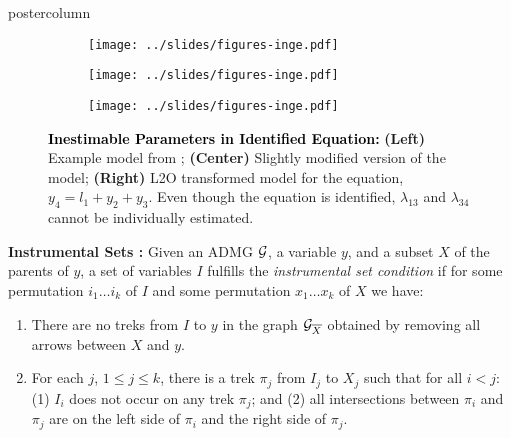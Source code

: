 \documentclass{beamer}
\newlength{\columnheight}
\begin{document}
\begin{frame}
\begin{columns}
	\begin{column}{0.33\textwidth}
		\begin{beamercolorbox}[center]{postercolumn}
			\begin{minipage}{.98\textwidth} %
				\parbox[t][\columnheight]{\textwidth}{ %
				\begin{myblock}{}
					\begin{figure}
						\begin{subfigure}{0.33 \linewidth}
							\centering
							\texttt{[image: ../slides/figures-inge.pdf]}
						\end{subfigure}%
						\begin{subfigure}{0.33 \linewidth}
							\centering
							\texttt{[image: ../slides/figures-inge.pdf]}
						\end{subfigure}%
						\begin{subfigure}{0.33 \linewidth}
							\centering
							\texttt{[image: ../slides/figures-inge.pdf]}
						\end{subfigure}
						\caption*{\textbf{\textcolor{black}{Inestimable Parameters in Identified Equation:}} \textbf{(Left)} Example model 
						from \citet{griliches1977estimating}; \textbf{(Center)} Slightly modified version of the model; \textbf{(Right)} L2O transformed
						model for the equation, $ y_4 = l_1 + y_2 + y_3 $. Even though the equation is identified, $ \lambda_{13} $ and 
						$ \lambda_{34} $ cannot be individually estimated.}
					\end{figure}
				\end{myblock}
	\begin{myblock}{}
		\textbf{Instrumental Sets \citep{BritoP02}:}
		\justifying Given an ADMG $\cal
			G$, a variable $y$, and a subset $X$ of the parents of $y$, 
			a set of variables
			$I$ fulfills the 
			\emph{instrumental set condition}
			if for {some} permutation $ i_1 \ldots i_k $ of
			$ I $ and {some} permutation
			$ x_1 \ldots x_k $ of $ X $ we have: 
			\begin{enumerate}
				\item There are no treks from $I$ to $y$ in the graph ${\cal
					G}_{\overline{X}}$ obtained by removing all arrows 
					between $X$ and $y$. 
				\item For each $j$, $1 \leq j \leq k$, there is a trek $\pi_j$ from
					$I_j$ to $X_j$ such that for all $i < j$: (1) $I_i$ does not
					occur on any trek $\pi_j$; and (2) all intersections between
					$\pi_i$ and $\pi_j$ are on the left side of $\pi_i$ and the
					right side of $\pi_j$.
			\end{enumerate}
		\vspace{0.5em}


\end{myblock}}
\end{minipage}
\end{beamercolorbox}
\end{column}
\end{columns}
\end{frame}
\end{document}
